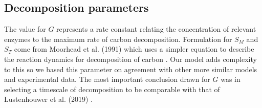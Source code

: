 \documentclass[12pt]{article}
\begin{document}
\begin{multicols}{2}

\subsection{Decomposition parameters}
The value for $G$ represents a rate constant relating the concentration of relevant enzymes to the maximum rate of carbon decomposition. Formulation for $S_{M}$ and $S_{T}$ come from Moorhead et al. (1991) which uses a simpler equation to describe the reaction dynamics for decomposition of carbon \cite{Moorhead1991}. Our model adds complexity to this so we based this parameter on agreement with other more similar models and experimental data. The most important conclusion drawn for $G$ was in selecting a timescale of decomposition to be comparable with that of Lustenhouwer et al. (2019) \cite{Lustenhouwer2020}.

\end{multicols}
\end{document}
